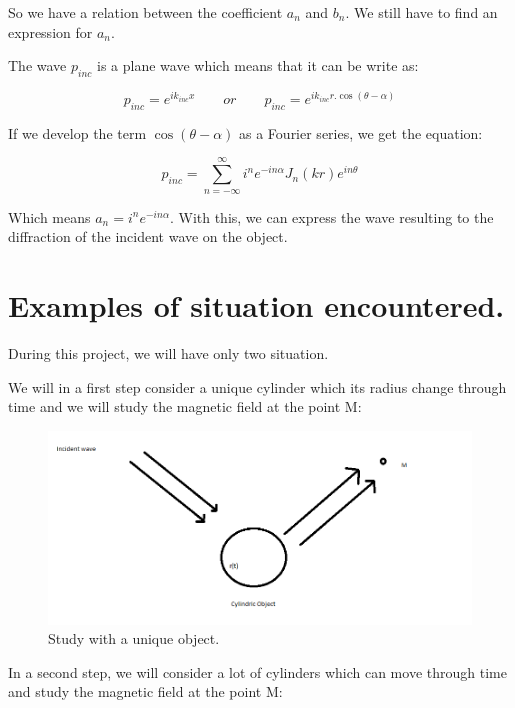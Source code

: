 So we have a relation between the coefficient $a_n$ and $b_n$. We still have to find an expression for $a_n$.

The wave $p_{inc}$ is a plane wave which means that it can be write as:

\begin{equation}
p_{inc} = e^{i k_{inc} x} \qquad or \qquad p_{inc} = e^{i k_{inc} r.\cos( \theta - \alpha )}
\end{equation}

If we develop the term $\cos(\theta-\alpha)$ as a Fourier series, we get the equation:

\begin{equation}
p_{inc} =  	\sum_{n=-\infty}^{\infty} i^n e^{-i n \alpha} J_{n}(kr)e^{in\theta} 
\end{equation}

Which means $a_n = i^n e^{-i n \alpha} $. With this, we can express the wave resulting to the diffraction of the incident wave on the object.

\chapter{Examples of situation encountered.}

During this project, we will have only two situation.

We will in a first step consider a unique  cylinder which its radius change through time and we will study the magnetic field at the point M:

\begin{figure}[H]
\centering
    \includegraphics[scale=0.6,angle=0]{Images/Image3.png}
    \caption{Study with a unique object.}
    \label{fig:Image3}
\end{figure}

In a second step, we will consider a lot of cylinders which can move through time and study the magnetic field at the point M: 

